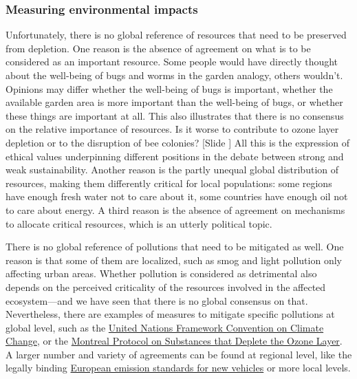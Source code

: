 \documentclass{article}
\newcounter{slide}
\begin{document}
\subsubsection{Measuring environmental impacts}
\label{sec:context}
Unfortunately, there is no global reference of resources that need to be preserved from depletion. One reason is the absence of agreement on what is to be considered as an important resource. Some people would have directly thought about the well-being of bugs and worms in the garden analogy, others wouldn't. Opinions may differ whether the well-being of bugs is important, whether the available garden area is more important than the well-being of bugs, or whether these things are important at all. This also illustrates that there is no consensus on the relative importance of resources. Is it worse to contribute to ozone layer depletion or to the disruption of bee colonies? {\color{blue}[Slide ]} All this is the expression of ethical values underpinning different positions in the debate between strong and weak sustainability. Another reason is the partly unequal global distribution of resources, making them differently critical for local populations: some regions have enough fresh water not to care about it, some countries have enough oil not to care about energy. A third reason is the absence of agreement on mechanisms to allocate critical resources, which is an utterly political topic. 

There is no global reference of pollutions that need to be mitigated as well. One reason is that some of them are localized, such as smog and light pollution only affecting urban areas. Whether pollution is considered as detrimental also depends on the perceived criticality of the resources involved in the affected ecosystem---and we have seen that there is no global consensus on that. Nevertheless, there are examples of measures to mitigate specific pollutions at global level, such as the \href{https://en.wikipedia.org/wiki/United_Nations_Framework_Convention_on_Climate_Change}{United Nations Framework Convention on Climate Change}, or the \href{https://en.wikipedia.org/wiki/Montreal_Protocol}{Montreal Protocol on Substances that Deplete the Ozone Layer}. A larger number and variety of agreements can be found at regional level, like the legally binding \href{https://en.wikipedia.org/wiki/European_emission_standards}{European emission standards for new vehicles} or more local levels. 
\end{document}
